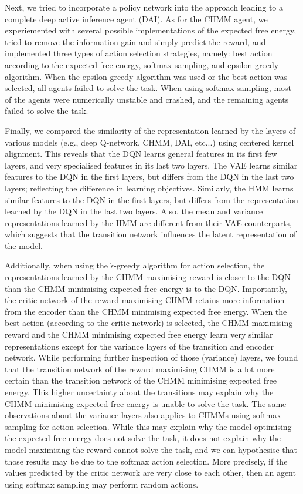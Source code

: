 \documentclass[twoside,11pt]{article}
\begin{document}
Next, we tried to incorporate a policy network into the approach leading to a complete deep active inference agent (DAI). As for the CHMM agent, we experiemented with several possible implementations of the expected free energy, tried to remove the information gain and simply predict the reward, and implemented three types of action selection strategies, namely: best action according to the expected free energy, softmax sampling, and epsilon-greedy algorithm. When the epsilon-greedy algorithm was used or the best action was selected, all agents failed to solve the task. When using softmax sampling, most of the agents were numerically unstable and crashed, and the remaining agents failed to solve the task. 

Finally, we compared the similarity of the representation learned by the layers of various models (e.g., deep Q-network, CHMM, DAI, etc...) using centered kernel alignment. This reveals that the DQN learns general features in its first few layers, and very specialised features in its last two layers. The VAE learns similar features to the DQN in the first layers, but differs from the DQN in the last two layers; reflecting the difference in learning objectives. Similarly, the HMM learns similar features to the DQN in the first layers, but differs from the representation learned by the DQN in the last two layers. Also, the mean and variance representations learned by the HMM are different from their VAE counterparts, which suggests that the transition network influences the latent representation of the model.

Additionally, when using the $\mathring{\epsilon}$-greedy algorithm for action selection, the representations learned by the CHMM maximising reward is closer to the DQN than the CHMM minimising expected free energy is to the DQN. Importantly, the critic network of the reward maximising CHMM retains more information from the encoder than the CHMM minimising expected free energy. When the best action (according to the critic network) is selected, the CHMM maximising reward and the CHMM minimising expected free energy learn very similar representations except for the variance layers of the transition and encoder network. While performing further inspection of those (variance) layers, we found that the transition network of the reward maximising CHMM is a lot more certain than the transition network of the CHMM minimising expected free energy. This higher uncertainty about the transitions may explain why the CHMM minimising expected free energy is unable to solve the task. The same observations about the variance layers also applies to CHMMs using softmax sampling for action selection. While this may explain why the model optimising the expected free energy does not solve the task, it does not explain why the model maximising the reward cannot solve the task, and we can hypothesise that those results may be due to the softmax action selection. More precisely, if the values predicted by the critic network are very close to each other, then an agent using softmax sampling may perform random actions. 
\end{document}

